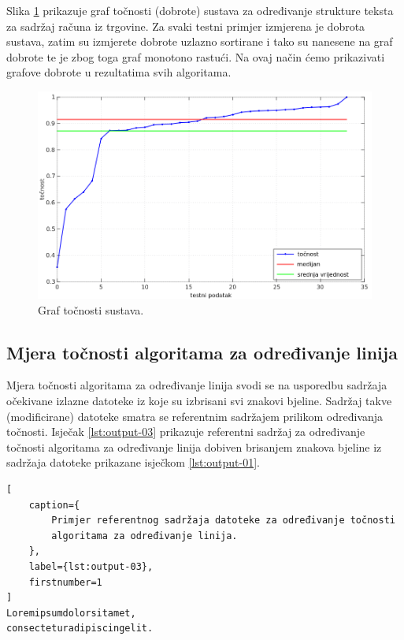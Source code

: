 \documentclass[times, utf8, zavrsni]{fer}
\begin{document}
Slika \ref{fig:result-example-01} prikazuje graf točnosti (dobrote) sustava za
određivanje strukture teksta za sadržaj računa iz trgovine. Za svaki testni
primjer izmjerena je dobrota sustava, zatim su izmjerete dobrote uzlazno
sortirane i tako su nanesene na graf dobrote te je zbog toga graf monotono
rastući. Na ovaj način ćemo prikazivati grafove dobrote u rezultatima svih
algoritama.

\begin{figure}[htb]
    \centering
    \captionsetup{justification=centering,margin=2cm}
    \includegraphics[width=\textwidth]{images/result-example-01.png}
    \caption{Graf točnosti sustava.}
    \label{fig:result-example-01}
\end{figure}




\subsection{Mjera točnosti algoritama za određivanje linija}
Mjera točnosti algoritama za određivanje linija svodi se na usporedbu
sadržaja očekivane izlazne datoteke iz koje su izbrisani svi znakovi bjeline.
Sadržaj takve (modificirane) datoteke smatra se referentnim sadržajem prilikom
određivanja točnosti. Isječak \ref{lst:output-03} prikazuje referentni sadržaj
za određivanje točnosti algoritama za određivanje linija dobiven brisanjem
znakova bjeline iz sadržaja datoteke prikazane isječkom \ref{lst:output-01}.

\begin{lstlisting}[
    caption={
        Primjer referentnog sadržaja datoteke za određivanje točnosti
        algoritama za određivanje linija.
    },
    label={lst:output-03},
    firstnumber=1
]
Loremipsumdolorsitamet,
consecteturadipiscingelit.
\end{lstlisting}
\end{document}
